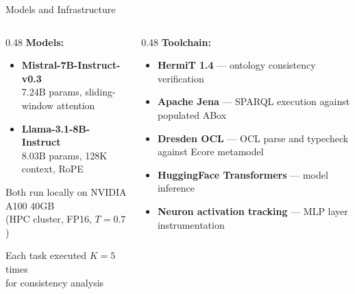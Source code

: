 \documentclass[aspectratio=169]{beamer}
\begin{document}
\begin{frame}{Models and Infrastructure}

\begin{columns}[T]
\begin{column}{0.48\textwidth}
\textbf{Models:}
\begin{itemize}
    \item \textbf{Mistral-7B-Instruct-v0.3}\\7.24B params, sliding-window attention
    \item \textbf{Llama-3.1-8B-Instruct}\\8.03B params, 128K context, RoPE
\end{itemize}

\vspace{0.5em}
Both run locally on NVIDIA A100 40GB\\(HPC cluster, FP16, $T\!=\!0.7$)

\vspace{0.5em}
Each task executed $K\!=\!5$ times\\for consistency analysis
\end{column}

\begin{column}{0.48\textwidth}
\textbf{Toolchain:}
\begin{itemize}
    \item \textbf{HermiT 1.4} --- ontology consistency verification
    \item \textbf{Apache Jena} --- SPARQL execution against populated ABox
    \item \textbf{Dresden OCL} --- OCL parse and typecheck against Ecore metamodel
    \item \textbf{HuggingFace Transformers} --- model inference
    \item \textbf{Neuron activation tracking} --- MLP layer instrumentation
\end{itemize}
\end{column}
\end{columns}

\end{frame}
\end{document}
